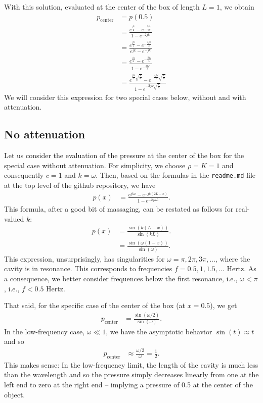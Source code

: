 \documentclass{article}
\begin{document}
With this solution, evaluated at the center of the box of length
$L=1$, we obtain
\begin{align*}
  p_\text{center} &= p(0.5)
  \\
  &= \frac{e^{\frac{jk}{2}} - e^{-\frac{3jk}{2}}}{1 - e^{-2jk}}
  \\
  &= \frac{e^{\frac{jk}{2}} - e^{-\frac{3jk}{2}}}{e^{jk} - e^{-jk}}
  \\
  &= \frac{e^{\frac{j\omega}{2c}} - e^{-\frac{3j\omega}{2c}}}{1 - e^{-\frac{2j\omega}{c}}}
  \\
  &= \frac{e^{\frac{j\omega}{2}\sqrt{\frac{\rho}{K}}} - e^{-\frac{3j\omega}{2}\sqrt{\frac{\rho}{K}}}}{1 - e^{-2j\omega\sqrt{\frac{\rho}{K}}}}
\end{align*}
We will consider this expression for two special cases below, without
and with attenuation.


\subsection{No attenuation}

Let us consider the evaluation of the pressure at the center of the
box for the special case without attenuation. For simplicity, we
choose $\rho=K=1$ and consequently $c=1$ and $k=\omega$. Then, based
on the formulas in the \texttt{readme.md} file at the top level of the
github repository, we have
\begin{align*}
  p(x)
  &=
  \frac{e^{jkx} - e^{-jk(2L-x)}}{1 - e^{-2jkL}}.
\end{align*}
This formula, after a good bit of massaging, can be restated as
follows for real-valued $k$:
\begin{align*}
  p(x)
  &=
  \frac{\sin(k(L-x))}{\sin(kL)}.
  \\
  &=
  \frac{\sin(\omega(1-x))}{\sin(\omega)}.
\end{align*}
This expression, unsurprisingly, has singularities for
$\omega=\pi,2\pi,3\pi,...$, where the cavity is in resonance. This
corresponds to frequencies $f=0.5, 1, 1.5, \ldots$ Hertz. As a
consequence, we better consider frequences below the first resonance,
i.e., $\omega<\pi$, i.e., $f<0.5$ Hertz.

That said, for the specific case of the center of the box (at $x=0.5$), we get
\begin{align*}
  p_\text{center}
  &= 
  \frac{\sin(\omega/2)}{\sin(\omega)}.
\end{align*}
In the low-frequency case, $\omega\ll 1$, we have the asymptotic
behavior $\sin(t)\approx t$ and so
\begin{align*}
  p_\text{center}
  &\approx
  \frac{\omega/2}{\omega}
  = \frac 12.
\end{align*}
This makes sense: In the low-frequency limit, the length of the cavity
is much less than the wavelength and so the pressure simply decreases
linearly from one at the left end to zero at the right end -- implying
a pressure of 0.5 at the center of the object.
\end{document}
